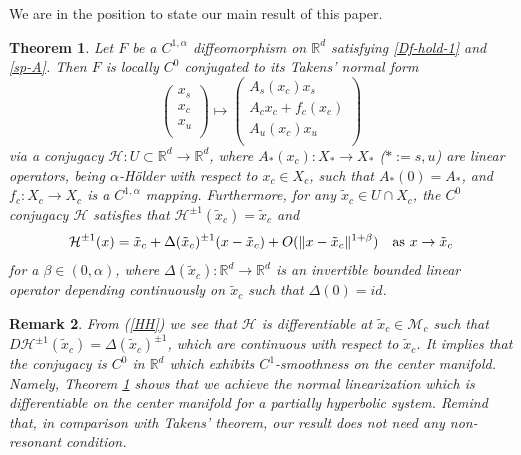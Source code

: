 \documentclass[reqno]{amsart}
\numberwithin{equation}{section}
\newtheorem{theorem}{Theorem}
\newtheorem{remark}[theorem]{Remark}
\begin{document}
We are in the position to state our main result of this paper.

\begin{theorem}\label{Mai-thm}
Let $F$ be 
a $C^{1,\alpha}$  diffeomorphism
on $\mathbb{R}^d$ satisfying \eqref{Df-hold-1} and \eqref{sp-A}.
Then $F$ is locally $C^0$ conjugated to its Takens’ normal form
\begin{equation}\label{Co-H}
\left(
  \begin{array}{c}
    x_s \\
    x_c \\
    x_u \\
  \end{array}
\right)
\mapsto
\left(
  \begin{array}{c}
    A_s(x_c)x_s \\
    A_c x_c+f_c(x_c) \\
    A_u(x_c)x_u \\
  \end{array}
\right)
\end{equation}
via a conjugacy $\mathcal{H}:U\subset \mathbb{R}^d\to \mathbb{R}^d$,
where $A_*(x_c):X_*\to X_*$ {\rm (}$*:=s,u${\rm )} are linear operators, being $\alpha$-H\"older with respect to $x_c\in X_c$, such that
$A_*(0)=A_*$, and $f_c:X_c\to X_c$ is 
a $C^{1,\alpha}$ mapping.
Furthermore, for any $\tilde{x}_c\in U\cap X_c$, the $C^0$ conjugacy $\mathcal{H}$ satisfies that $\mathcal{H}^{\pm 1}(\tilde{x}_c)=\tilde{x}_c$ and
\begin{align}\label{HH}
\mathcal{H}^{\pm 1}(x)=\tilde x_c+ \Delta(\tilde{x}_c)^{\pm 1}(x-\tilde{x}_c) +O(\|x-\tilde{x}_c\|^{1+\beta}) \quad {\rm as}~x\to \tilde x_c
\end{align}
for a $\beta\in (0,\alpha)$, where
$\Delta(\tilde{x}_c):\mathbb{R}^d\to \mathbb{R}^d$ is an invertible bounded linear operator depending continuously on $\tilde{x}_c$ such that $\Delta(0)=id$.
\end{theorem}


\begin{remark}{\rm From (\ref{HH}) we see that $\mathcal{H}$ is differentiable at $\tilde x_c\in {\mathcal M}_c$ such that
$D\mathcal{H}^{\pm 1}(\tilde{x}_c)=\Delta(\tilde{x}_c)^{\pm 1}$, which are continuous with respect to $\tilde{x}_c$.
It implies that the conjugacy is $C^0$ in $\mathbb{R}^d$
which exhibits $C^1$-smoothness on the center manifold. Namely, Theorem \ref{Mai-thm} shows that we  achieve the normal linearization which is differentiable
on the center manifold for a partially hyperbolic system. Remind that, in comparison with Takens' theorem, our result does not need any non-resonant condition.
}
\end{remark}
\end{document}
